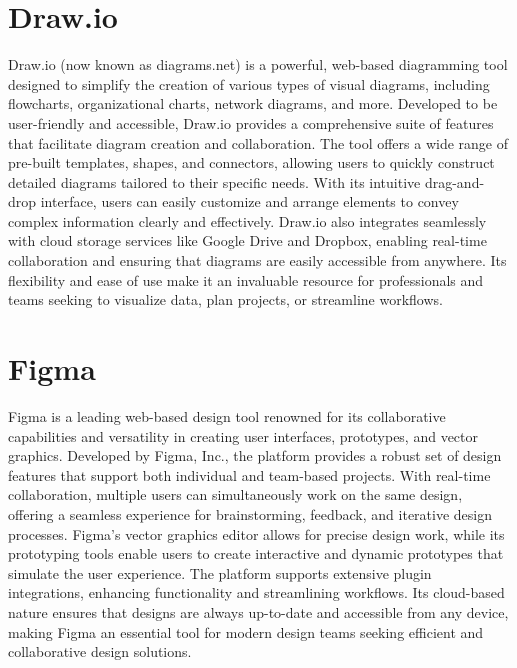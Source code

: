 \section*{Draw.io}
Draw.io (now known as diagrams.net) is a powerful, web-based diagramming tool designed to simplify the creation of various types of visual diagrams, including flowcharts, organizational charts, network diagrams, and more. Developed to be user-friendly and accessible, Draw.io provides a comprehensive suite of features that facilitate diagram creation and collaboration. The tool offers a wide range of pre-built templates, shapes, and connectors, allowing users to quickly construct detailed diagrams tailored to their specific needs. With its intuitive drag-and-drop interface, users can easily customize and arrange elements to convey complex information clearly and effectively. Draw.io also integrates seamlessly with cloud storage services like Google Drive and Dropbox, enabling real-time collaboration and ensuring that diagrams are easily accessible from anywhere. Its flexibility and ease of use make it an invaluable resource for professionals and teams seeking to visualize data, plan projects, or streamline workflows.
\section*{Figma}
Figma is a leading web-based design tool renowned for its collaborative capabilities and versatility in creating user interfaces, prototypes, and vector graphics. Developed by Figma, Inc., the platform provides a robust set of design features that support both individual and team-based projects. With real-time collaboration, multiple users can simultaneously work on the same design, offering a seamless experience for brainstorming, feedback, and iterative design processes. Figma’s vector graphics editor allows for precise design work, while its prototyping tools enable users to create interactive and dynamic prototypes that simulate the user experience. The platform supports extensive plugin integrations, enhancing functionality and streamlining workflows. Its cloud-based nature ensures that designs are always up-to-date and accessible from any device, making Figma an essential tool for modern design teams seeking efficient and collaborative design solutions.
